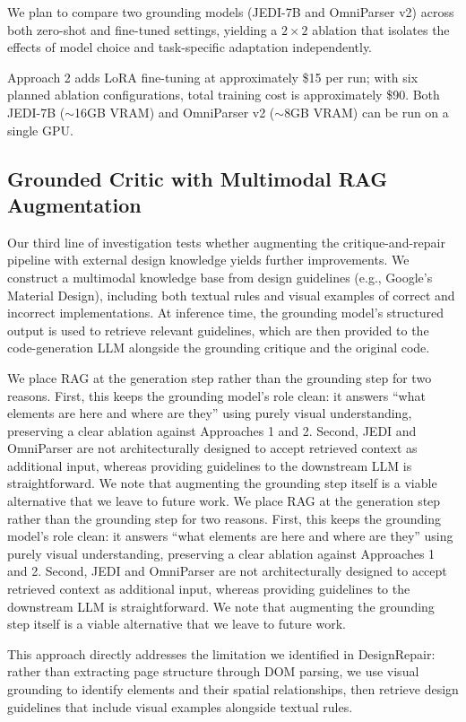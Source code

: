 \documentclass[11pt]{article}
\begin{document}
We plan to compare two grounding models (JEDI-7B and OmniParser v2) across both zero-shot and fine-tuned settings, yielding a $2 \times 2$ ablation that isolates the effects of model choice and task-specific adaptation independently.

Approach 2 adds LoRA fine-tuning at approximately \$15 per run; with six planned ablation configurations, total training cost is approximately \$90. Both JEDI-7B ($\sim$16GB VRAM) and OmniParser v2 ($\sim$8GB VRAM) can be run on a single GPU.

\subsection{Grounded Critic with Multimodal RAG Augmentation}

Our third line of investigation tests whether augmenting the critique-and-repair pipeline with external design knowledge yields further improvements. We construct a multimodal knowledge base from design guidelines (e.g., Google's Material Design), including both textual rules and visual examples of correct and incorrect implementations. At inference time, the grounding model's structured output is used to retrieve relevant guidelines, which are then provided to the code-generation LLM alongside the grounding critique and the original code.

We place RAG at the generation step rather than the grounding step for two reasons. First, this keeps the grounding model's role clean: it answers ``what elements are here and where are they'' using purely visual understanding, preserving a clear ablation against Approaches 1 and 2. Second, JEDI and OmniParser are not architecturally designed to accept retrieved context as additional input, whereas providing guidelines to the downstream LLM is straightforward. We note that augmenting the grounding step itself is a viable alternative that we leave to future work.
We place RAG at the generation step rather than the grounding step for two reasons. First, this keeps the grounding model's role clean: it answers ``what elements are here and where are they'' using purely visual understanding, preserving a clear ablation against Approaches 1 and 2. Second, JEDI and OmniParser are not architecturally designed to accept retrieved context as additional input, whereas providing guidelines to the downstream LLM is straightforward. We note that augmenting the grounding step itself is a viable alternative that we leave to future work.

This approach directly addresses the limitation we identified in DesignRepair: rather than extracting page structure through DOM parsing, we use visual grounding to identify elements and their spatial relationships, then retrieve design guidelines that include visual examples alongside textual rules.
\end{document}
